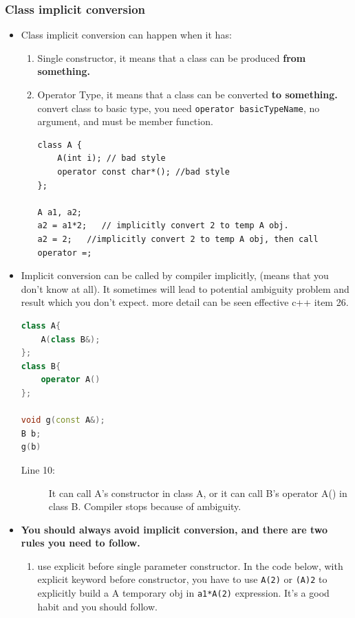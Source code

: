 \documentclass[a4paper,11pt,twoside]{book}
\begin{document}
\subsubsection{Class implicit conversion}
\begin{itemize}
	
	\item Class implicit conversion can happen when it has:
	\begin{enumerate}
		\item Single constructor, it means that a class can be produced \textbf{from something.}
		\item Operator Type, it means that a class can be converted \textbf{to something.} convert class to basic type, you need \texttt{operator basicTypeName}, no argument, and must be member function.

\begin{lstlisting}
class A {
	A(int i); // bad style
	operator const char*(); //bad style
};
	
A a1, a2;
a2 = a1*2;   // implicitly convert 2 to temp A obj.
a2 = 2;   //implicitly convert 2 to temp A obj, then call operator =;
\end{lstlisting}
	\end{enumerate}
	
	\item Implicit conversion can be called by compiler implicitly, (means that you don't know at all). It sometimes will lead to potential ambiguity problem and result which you don't expect. more detail can be seen effective c++ item 26.
\begin{lstlisting}[frame=single, language=c++]
class A{
	A(class B&);
};
class B{
	operator A()
};
	
void g(const A&);
B b;
g(b)
\end{lstlisting}
\begin{description}
	\item[Line 10:]	It can call A's constructor in class A, or it can call B's operator A() in class B. Compiler stops because of ambiguity.
\end{description}	
	
	\item \textbf{You should always avoid implicit conversion, and there are two rules you need to follow.}
	\begin{enumerate}
		\item use explicit before single parameter constructor. In the code below, with explicit keyword before constructor,  you have to use \texttt{A(2)} or \texttt{(A)2} to explicitly build a A temporary obj in \texttt{a1*A(2)} expression. It's a good habit and you should follow. 
		

\end{enumerate}
\end{itemize}
\end{document}
